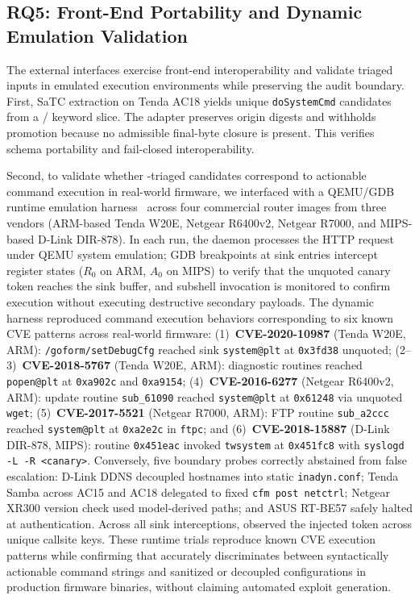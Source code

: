 \subsection{RQ5: Front-End Portability and Dynamic Emulation Validation}
\label{sec:rq5}

The external interfaces exercise front-end interoperability and validate triaged inputs in emulated execution environments while preserving the audit boundary.
First, SaTC extraction on Tenda AC18 yields \TSDSSaTCCandidates{} unique \texttt{doSystemCmd} candidates from a \TSDSSaTCKeywordSlice{}/\TSDSSaTCKeywords{} keyword slice. The adapter preserves origin digests and withholds promotion because no admissible final-byte closure is present. This verifies schema portability and fail-closed interoperability.

Second, to validate whether \tool-triaged candidates correspond to actionable command execution in real-world firmware, we interfaced \tool with a QEMU/GDB runtime emulation harness~\cite{bellard2005qemu} across four commercial router images from three vendors (ARM-based Tenda W20E, Netgear R6400v2, Netgear R7000, and MIPS-based D-Link DIR-878).
In each run, the daemon processes the HTTP request under QEMU system emulation; GDB breakpoints at sink entries intercept register states ($R_0$ on ARM, $A_0$ on MIPS) to verify that the unquoted canary token reaches the sink buffer, and subshell invocation is monitored to confirm execution without executing destructive secondary payloads.
The dynamic harness reproduced command execution behaviors corresponding to six known CVE patterns across real-world firmware:
(1)~\textbf{CVE-2020-10987} (Tenda W20E, ARM): \texttt{/goform/setDebugCfg} reached sink \texttt{system@plt} at \texttt{0x3fd38} unquoted;
(2--3)~\textbf{CVE-2018-5767} (Tenda W20E, ARM): diagnostic routines reached \texttt{popen@plt} at \texttt{0xa902c} and \texttt{0xa9154};
(4)~\textbf{CVE-2016-6277} (Netgear R6400v2, ARM): update routine \texttt{sub\_61090} reached \texttt{system@plt} at \texttt{0x61248} via unquoted \texttt{wget};
(5)~\textbf{CVE-2017-5521} (Netgear R7000, ARM): FTP routine \texttt{sub\_a2ccc} reached \texttt{system@plt} at \texttt{0xa2e2c} in \texttt{ftpc};
and (6)~\textbf{CVE-2018-15887} (D-Link DIR-878, MIPS): routine \texttt{0x451eac} invoked \texttt{twsystem} at \texttt{0x451fc8} with \texttt{syslogd -L -R <canary>}.
Conversely, five boundary probes correctly abstained from false escalation: D-Link DDNS decoupled hostnames into static \texttt{inadyn.conf}; Tenda Samba across AC15 and AC18 delegated to fixed \texttt{cfm post netctrl}; Netgear XR300 version check used model-derived paths; and ASUS RT-BE57 safely halted at authentication.
Across all \TSDSRuntimeAttempts{} sink interceptions, \TSDSPositiveRuntimeAttempts{} observed the injected token across \TSDSUniqueRuntimeKeys{} unique callsite keys. These runtime trials reproduce known CVE execution patterns while confirming that \tool accurately discriminates between syntactically actionable command strings and sanitized or decoupled configurations in production firmware binaries, without claiming automated exploit generation.
